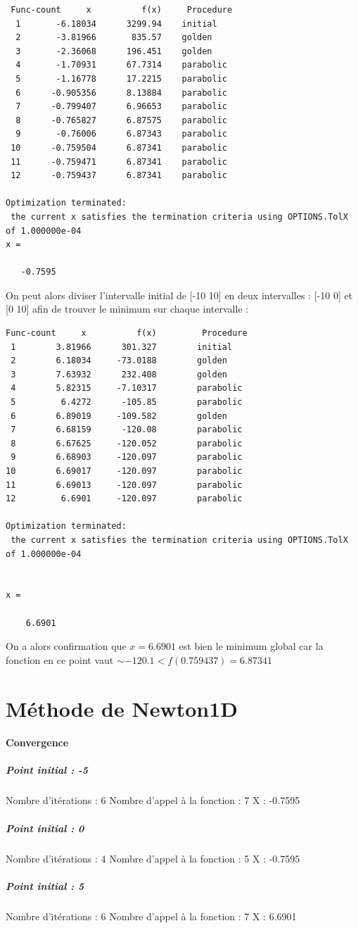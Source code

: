 \documentclass[twocolumn,10pt,a4paper]{article}
\begin{document}
\begin{lstlisting}
 Func-count     x          f(x)     Procedure
  1       -6.18034      3299.94    initial
  2       -3.81966       835.57    golden
  3       -2.36068      196.451    golden
  4       -1.70931      67.7314    parabolic
  5       -1.16778      17.2215    parabolic
  6      -0.905356      8.13884    parabolic
  7      -0.799407      6.96653    parabolic
  8      -0.765827      6.87575    parabolic
  9       -0.76006      6.87343    parabolic
 10      -0.759504      6.87341    parabolic
 11      -0.759471      6.87341    parabolic
 12      -0.759437      6.87341    parabolic
 
Optimization terminated:
 the current x satisfies the termination criteria using OPTIONS.TolX of 1.000000e-04 
x =

   -0.7595

\end{lstlisting}

On peut alors diviser l'intervalle initial de [-10 10] en deux intervalles : [-10 0] et [0 10] afin de trouver le minimum sur chaque intervalle :

\begin{lstlisting}
Func-count     x          f(x)         Procedure
 1        3.81966      301.327        initial
 2        6.18034     -73.0188        golden
 3        7.63932      232.408        golden
 4        5.82315     -7.10317        parabolic
 5         6.4272      -105.85        parabolic
 6        6.89019     -109.582        golden
 7        6.68159      -120.08        parabolic
 8        6.67625     -120.052        parabolic
 9        6.68903     -120.097        parabolic
10        6.69017     -120.097        parabolic
11        6.69013     -120.097        parabolic
12         6.6901     -120.097        parabolic
 
Optimization terminated:
 the current x satisfies the termination criteria using OPTIONS.TolX of 1.000000e-04 


x =

    6.6901
\end{lstlisting}
On a alors confirmation que $x=6.6901$ est bien le minimum global car la fonction en ce point vaut $\sim -120.1<f(0.759437)=6.87341$
\section{Méthode de Newton1D}
\paragraph{Convergence}
\subparagraph*{Point initial : -5}
Nombre d'itérations : 6
Nombre d'appel à la fonction : 7
X : -0.7595
\subparagraph*{Point initial : 0}
Nombre d'itérations : 4
Nombre d'appel à la fonction : 5
X : -0.7595
\subparagraph*{Point initial : 5}
Nombre d'itérations : 6
Nombre d'appel à la fonction : 7
X : 6.6901\\
\end{document}
